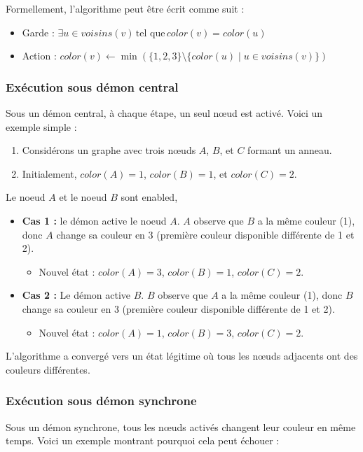 \documentclass[11pt]{article}
\begin{document}
Formellement, l'algorithme peut être écrit comme suit :
\begin{itemize}
\item Garde : \(\exists u \in voisins(v) \, \text{tel que} \, color(v) = color(u)\)
\item Action : \(color(v) \leftarrow \min(\{1, 2, 3\} \setminus \{color(u) \mid u \in voisins(v)\})\)
\end{itemize}

\subsubsection{Exécution sous démon central}
\label{sec:org40eb9fe}
Sous un démon central, à chaque étape, un seul nœud est activé. Voici un exemple simple :

\begin{enumerate}
\item Considérons un graphe avec trois nœuds \(A\), \(B\), et \(C\) formant un anneau.
\item Initialement, \(color(A) = 1\), \(color(B) = 1\), et \(color(C) = 2\).
\end{enumerate}

Le noeud \(A\) et le noeud \(B\) sont enabled, 

\begin{itemize}
\item \textbf{\textbf{Cas 1 :}} le démon active le noeud \(A\). \(A\) observe que \(B\) a la même couleur (1), donc \(A\) change sa couleur en 3 (première couleur disponible différente de 1 et 2).
\begin{itemize}
\item Nouvel état : \(color(A) = 3\), \(color(B) = 1\), \(color(C) = 2\).
\end{itemize}
\item \textbf{\textbf{Cas 2 :}} Le démon active \(B\). \(B\) observe que \(A\) a la même couleur (1), donc \(B\) change sa couleur en 3 (première couleur disponible différente de 1 et 2).
\begin{itemize}
\item Nouvel état : \(color(A) = 1\), \(color(B) = 3\), \(color(C) = 2\).
\end{itemize}
\end{itemize}

L'algorithme a convergé vers un état légitime où tous les nœuds adjacents ont des couleurs différentes.

\subsubsection{Exécution sous démon synchrone}
\label{sec:orgc976707}
Sous un démon synchrone, tous les nœuds activés changent leur couleur en même temps. Voici un exemple montrant pourquoi cela peut échouer :
\end{document}
